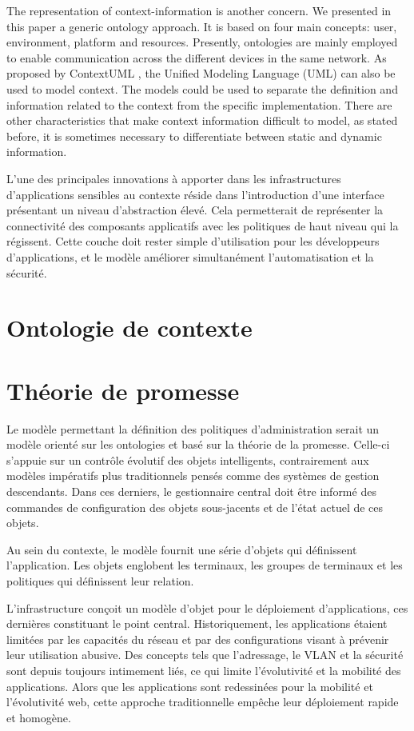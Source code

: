 The representation of context-information is another concern. We presented in
this paper a generic ontology approach. It is based on four main concepts: user,
environment, platform and resources.  Presently, ontologies are mainly employed
to enable communication across the different devices in the same network. As
proposed by ContextUML \cite{Sheng2005}, the Unified Modeling Language (UML) can
also be used to model context. The models could be used to separate the
definition and information related to the context from the specific
implementation. There are other characteristics that make context information
difficult to model, as stated before, it is sometimes necessary to differentiate
between static and dynamic information.


L'une des principales innovations à apporter dans les infrastructures
d'applications sensibles au contexte réside dans l'introduction d'une interface
présentant un niveau d'abstraction élevé. Cela permetterait de représenter la
connectivité des composants applicatifs avec les politiques de haut niveau qui
la régissent.  Cette couche doit rester simple d'utilisation pour les
développeurs d'applications, et le modèle améliorer simultanément
l'automatisation et la sécurité.

\section{Ontologie de contexte}

\section{Théorie de promesse}

Le modèle permettant la définition des politiques d'administration serait un
modèle orienté sur les ontologies et basé sur la théorie de la promesse.
Celle-ci s'appuie sur un contrôle évolutif des objets intelligents,
contrairement aux modèles impératifs plus traditionnels pensés comme des
systèmes de gestion descendants.  Dans ces derniers, le gestionnaire central
doit être informé des commandes de configuration des objets sous-jacents et de
l'état actuel de ces objets.

Au sein du contexte, le modèle fournit une série d'objets qui définissent
l'application. Les objets englobent les terminaux, les groupes de terminaux et
les politiques qui définissent leur relation.

L'infrastructure conçoit un modèle d'objet pour le déploiement d'applications,
ces dernières constituant le point central. Historiquement, les applications
étaient limitées par les capacités du réseau et par des configurations visant à
prévenir leur utilisation abusive. Des concepts tels que l'adressage, le VLAN et
la sécurité sont depuis toujours intimement liés, ce qui limite l'évolutivité et
la mobilité des applications. Alors que les applications sont redessinées pour
la mobilité et l'évolutivité web, cette approche traditionnelle empêche leur
déploiement rapide et homogène.

